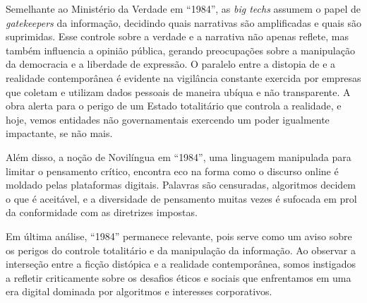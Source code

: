 \documentclass[
	12pt,
	openright,
	twoside,
	a4paper,
	english,
	french,
	spanish,
	brazil
]{abntex2}
\begin{document}
  Semelhante ao Ministério da Verdade em ``1984'', as \textit{big techs} assumem
  o papel de \textit{gatekeepers} da informação, decidindo quais narrativas são
  amplificadas e quais são suprimidas. Esse controle sobre a verdade e a
  narrativa não apenas reflete, mas também influencia a opinião pública, gerando
  preocupações sobre a manipulação da democracia e a liberdade de expressão. O
  paralelo entre a distopia de  e a realidade
  contemporânea é evidente na vigilância constante exercida por empresas que
  coletam e utilizam dados pessoais de maneira ubíqua e não transparente. A obra
  alerta para o perigo de um Estado totalitário que controla a realidade, e
  hoje, vemos entidades não governamentais exercendo um poder igualmente
  impactante, se não mais.

  Além disso, a noção de Novilíngua em ``1984'', uma linguagem manipulada para
  limitar o pensamento crítico, encontra eco na forma como o discurso online é
  moldado pelas plataformas digitais. Palavras são censuradas, algoritmos
  decidem o que é aceitável, e a diversidade de pensamento muitas vezes é
  sufocada em prol da conformidade com as diretrizes impostas.

  Em última análise, ``1984'' permanece relevante, pois serve como um aviso sobre
  os perigos do controle totalitário e da manipulação da informação. Ao observar
  a interseção entre a ficção distópica e a realidade contemporânea, somos
  instigados a refletir criticamente sobre os desafios éticos e sociais que
  enfrentamos em uma era digital dominada por algoritmos e interesses
  corporativos.

  \postextual

  
\end{document}
